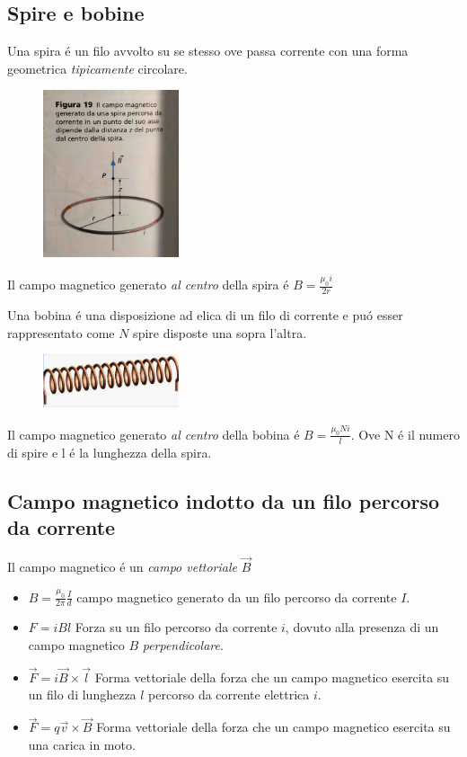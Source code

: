 \documentclass[17pt]{article}
\begin{document}
\subsection{Spire e bobine}


Una spira \'e un filo avvolto su se stesso ove passa corrente con una forma geometrica \emph{tipicamente} circolare. 




\begin{figure}[th]
\includegraphics[width=4cm]{spiraMagnetica.jpg}
\centering
\end{figure}

Il campo magnetico generato \emph{al centro} della spira \'e $B = \frac{\mu_0 i}{2r}$

Una bobina \'e una disposizione ad elica di un filo di corrente e pu\'o esser rappresentato come $N$ spire disposte una sopra l'altra.



\begin{figure}[th]
\includegraphics[width=4cm]{Bobina.png}
\centering
\end{figure}

Il campo magnetico generato \emph{al centro} della bobina \'e $B = \frac{\mu_0 N i}{l}$. Ove N \'e il numero di spire e l \'e la lunghezza della spira.

\subsection{Campo magnetico indotto da un filo percorso da corrente}
Il campo magnetico \'e un \emph{campo vettoriale} $\vec{B}$

\begin{itemize}
	\item $B = \frac{\mu_0}{2\pi} \frac{I}{d}$ campo magnetico generato da un filo percorso da corrente $I$.
	\item $F = iBl$ Forza su un filo percorso da corrente $i$, dovuto alla presenza di un campo magnetico $B$ \emph{perpendicolare}.
	\item $\vec{F} = i\vec{B}\times\vec{l}$ Forma vettoriale della forza che un campo magnetico esercita su un filo di lunghezza $l$ percorso da corrente elettrica $i$.
	\item $\vec{F} = q\vec{v}\times\vec{B}$ Forma vettoriale della forza che un campo magnetico esercita su una carica in moto.
\end{itemize}
\end{document}
